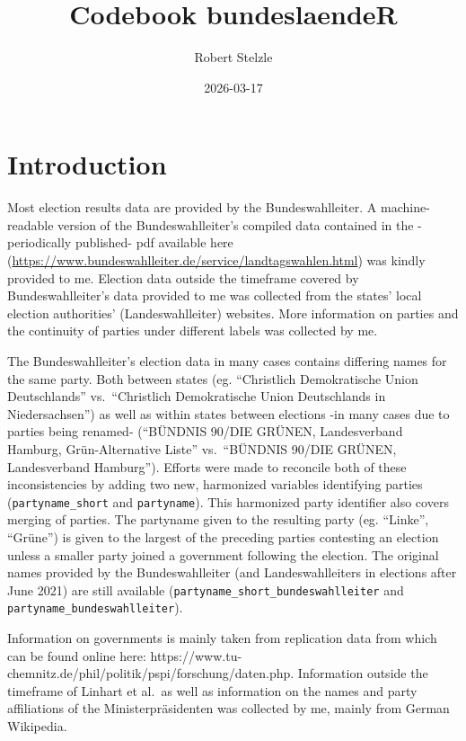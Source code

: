 \documentclass[
  a4paper,
  DIV=11,
  numbers=noendperiod]{scrartcl}
\title{Codebook bundeslaendeR}
\author{Robert Stelzle}
\date{2026-03-17}
\renewcommand*\contentsname{Table of contents}
\newcommand\contentsname{Table of contents}
\begin{document}
\maketitle

\renewcommand*\contentsname{Table of contents}
{
\hypersetup{linkcolor=}
\setcounter{tocdepth}{1}
\tableofcontents
}
\clearpage

\hypersetup{colorlinks=true, allcolors=Nettrot}

\section{Introduction}\label{introduction}

Most election results data are provided by the Bundeswahlleiter. A
machine-readable version of the Bundeswahlleiter's compiled data
contained in the -periodically published- pdf available here
(\url{https://www.bundeswahlleiter.de/service/landtagswahlen.html}) was
kindly provided to me. Election data outside the timeframe covered by
Bundeswahlleiter's data provided to me was collected from the states'
local election authorities' (Landeswahlleiter) websites. More
information on parties and the continuity of parties under different
labels was collected by me.

The Bundeswahlleiter's election data in many cases contains differing
names for the same party. Both between states (eg. ``Christlich
Demokratische Union Deutschlands'' vs.~``Christlich Demokratische Union
Deutschlands in Niedersachsen'') as well as within states between
elections -in many cases due to parties being renamed- (``BÜNDNIS 90/DIE
GRÜNEN, Landesverband Hamburg, Grün-Alternative Liste'' vs.~``BÜNDNIS
90/DIE GRÜNEN, Landesverband Hamburg''). Efforts were made to reconcile
both of these inconsistencies by adding two new, harmonized variables
identifying parties (\texttt{partyname\_short} and \texttt{partyname}).
This harmonized party identifier also covers merging of parties. The
partyname given to the resulting party (eg. ``Linke'', ``Grüne'') is
given to the largest of the preceding parties contesting an election
unless a smaller party joined a government following the election. The
original names provided by the Bundeswahlleiter (and Landeswahlleiters
in elections after June 2021) are still available
(\texttt{partyname\_short\_bundeswahlleiter} and
\texttt{partyname\_bundeswahlleiter}).

Information on governments is mainly taken from replication data from
\textcite{linhartProportionaleMinisterienaufteilungDeutschen2008} which
can be found online here:
https://www.tu-chemnitz.de/phil/politik/pspi/forschung/daten.php.
Information outside the timeframe of Linhart et al.~as well as
information on the names and party affiliations of the
Ministerpräsidenten was collected by me, mainly from German Wikipedia.
\end{document}

